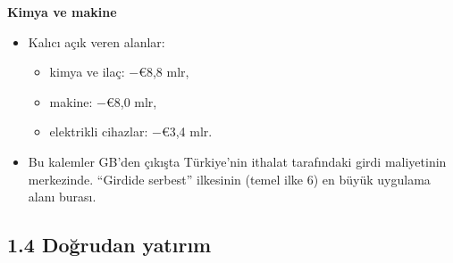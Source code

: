 \textbf{Kimya ve makine}

\begin{itemize}
\tightlist
\item
  Kalıcı açık veren alanlar:

  \begin{itemize}
  \tightlist
  \item
    kimya ve ilaç: −€8,8 mlr,
  \item
    makine: −€8,0 mlr,
  \item
    elektrikli cihazlar: −€3,4 mlr.
  \end{itemize}
\item
  Bu kalemler GB'den çıkışta Türkiye'nin ithalat tarafındaki girdi maliyetinin merkezinde. ``Girdide serbest'' ilkesinin (temel ilke 6) en büyük uygulama alanı burası.
\end{itemize}

\hypertarget{01_teshis-14-doux11frudan-yatux131rux131m}{%
\subsection{1.4 Doğrudan yatırım}\label{01_teshis-14-doux11frudan-yatux131rux131m}}

